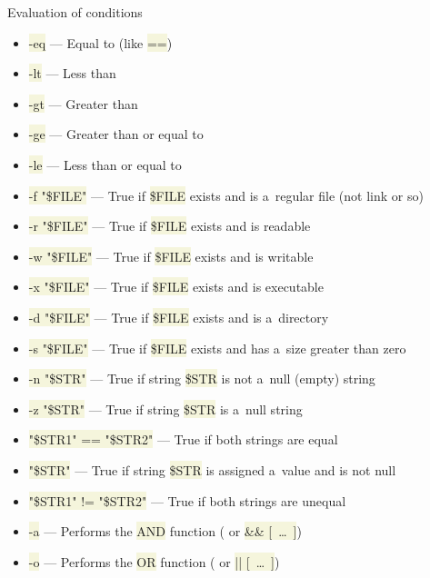 \documentclass[compress, xelatex, 11pt, xcolor=svgnames, aspectratio=169, url={hyphens, lowtilde}]{beamer}
\renewcommand{\texttt}[1]{\colorbox{Beige}{{\ttfamily #1}}}
\begin{document}
\begin{frame}[allowframebreaks]{Evaluation of conditions}
\begin{itemize}
\begin{itemize}
			\item \texttt{-eq} --- Equal to (like \texttt{==})
			\item \texttt{-lt} --- Less than
			\item \texttt{-gt} --- Greater than
			\item \texttt{-ge} --- Greater than or equal to
			\item \texttt{-le} --- Less than or equal to
			\item \texttt{-f "\$\textbraceleft FILE\textbraceright "} --- True if \texttt{\$FILE} exists and is a~regular file (not link or so)
			\item \texttt{-r "\$\textbraceleft FILE\textbraceright "} --- True if \texttt{\$FILE} exists and is readable
			\item \texttt{-w "\$\textbraceleft FILE\textbraceright "} --- True if \texttt{\$FILE} exists and is writable
			\item \texttt{-x "\$\textbraceleft FILE\textbraceright "} --- True if \texttt{\$FILE} exists and is executable
			\item \texttt{-d "\$\textbraceleft FILE\textbraceright "} --- True if \texttt{\$FILE} exists and is a~directory
			\item \texttt{-s "\$\textbraceleft FILE\textbraceright "} --- True if \texttt{\$FILE} exists and has a~size greater than zero
			\item \texttt{-n "\$\textbraceleft STR\textbraceright "} --- True if string \texttt{\$STR} is not a~null (empty) string
			\item \texttt{-z "\$\textbraceleft STR\textbraceright "} --- True if string \texttt{\$STR} is a~null string
			\item \texttt{"\$\textbraceleft STR1\textbraceright " == "\$\textbraceleft STR2\textbraceright "} --- True if both strings are equal
			\item \texttt{"\$\textbraceleft STR\textbraceright "} --- True if string \texttt{\$STR} is assigned a~value and is not null
			\item \texttt{"\$\textbraceleft STR1\textbraceright " != "\$\textbraceleft STR2\textbraceright "} --- True if both strings are unequal
			\item \texttt{-a} --- Performs the \texttt{AND} function (\texttt{[~\ldots~-a~\ldots~]} or \texttt{[~\ldots~] \&\& [~\ldots~]})
			\item \texttt{-o} --- Performs the \texttt{OR} function (\texttt{[~\ldots~-o~\ldots~]} or \texttt{[~\ldots~] || [~\ldots~]})
		\end{itemize}

\end{itemize}
\end{frame}
\end{document}
